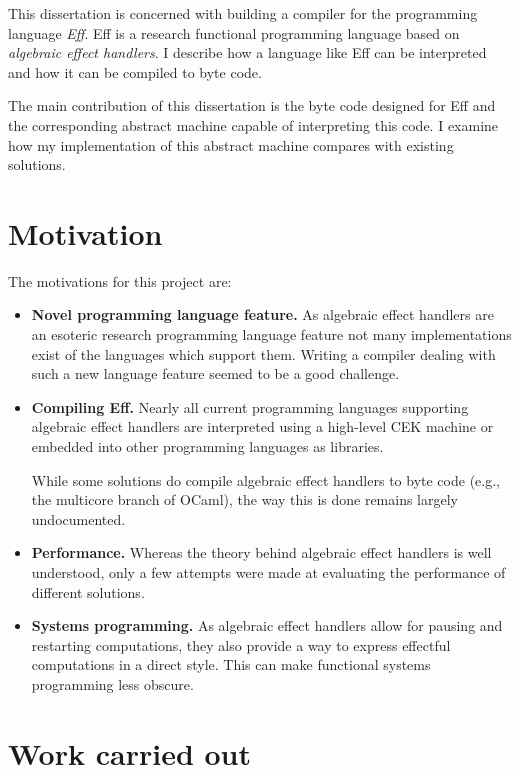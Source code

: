 \documentclass[class=article,crop=false,11pt]{standalone}
\begin{document}
This dissertation is concerned with building a compiler for the programming 
language \emph{Eff}. Eff is a research functional programming language based 
on \emph{algebraic effect handlers}. I describe how a language like Eff can 
be interpreted and how it can be compiled to byte code.

The main contribution of this dissertation is the byte code designed for Eff
and the corresponding abstract machine capable of interpreting this code. I 
examine how my implementation of this abstract machine compares with 
existing solutions.

\section{Motivation}
The motivations for this project are:
\begin{itemize}
\item \textbf{Novel programming language feature.} 
As algebraic effect handlers are an esoteric research programming language
feature not many implementations exist of the languages which support them.
Writing a compiler dealing with such a new language feature seemed to be a
good challenge.

\item \textbf{Compiling Eff.}
Nearly all current programming languages supporting algebraic effect handlers
are interpreted using a high-level CEK machine or embedded into other
programming languages as libraries.

While some solutions do compile algebraic effect handlers to byte code (e.g.,
the multicore branch of OCaml), the way this is done remains largely
undocumented.

\item \textbf{Performance.}
Whereas the theory behind algebraic effect handlers is well understood, only a
few attempts were made at evaluating the performance of different solutions.

\item \textbf{Systems programming.}
As algebraic effect handlers allow for pausing and restarting computations, they
also provide a way to express effectful computations in a direct style.
This can make functional systems programming less obscure.

\end{itemize}

\section{Work carried out}
\end{document}
